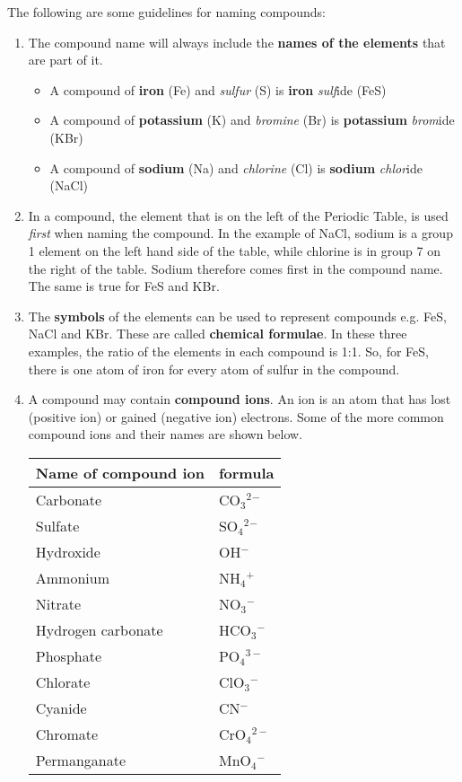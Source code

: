 The following are some guidelines for naming compounds:

\begin{enumerate}

\item{The compound name will always include the \textbf{names of the elements} that are part of it.}

	\begin{itemize}
	\item{A compound of \textbf{iron} (Fe) and \textit{sulfur} (S) is \textbf{iron} \textit{sulf}ide (FeS)}
	\item{A compound of \textbf{potassium} (K) and \textit{bromine} (Br) is \textbf{potassium} \textit{brom}ide (KBr)}
	\item{A compound of \textbf{sodium} (Na) and \textit{chlorine} (Cl) is \textbf{sodium} \textit{chlor}ide (NaCl)}
	\end{itemize}

\item{In a compound, the element that is on the left of the Periodic Table, is used \textit{first} when naming the compound. In the example of NaCl, sodium is a group 1 element on the left hand side of the table, while chlorine is in group 7 on the right of the table. Sodium therefore comes first in the compound name. The same is true for FeS and KBr.}

\item{The \textbf{symbols} of the elements can be used to represent compounds e.g. FeS, NaCl and KBr. These are called \textbf{chemical formulae}. In these three examples, the ratio of the elements in each compound is 1:1. So, for FeS, there is one atom of iron for every atom of sulfur in the compound.}

\item{A compound may contain \textbf{compound ions}. An ion is an atom that has lost (positive ion) or gained (negative ion) electrons. Some of the more common compound ions and their names are shown below.

\begin{center}
\begin{tabular}{|l|l|}\hline
Name of compound ion & formula\\\hline
Carbonate & CO$_3$$^2$$^-$\\\hline
Sulfate & SO$_4$$^2$$^-$\\\hline
Hydroxide & OH$^-$\\\hline
Ammonium & NH$_{4}$$^{+}$\\\hline
Nitrate & NO$_{3}$$^{-}$\\\hline
Hydrogen carbonate & HCO$_3$$^-$\\\hline
Phosphate & PO$_{4}$$^{3-}$\\\hline
Chlorate & ClO$_{3}$$^{-}$\\\hline
Cyanide & CN$^{-}$\\\hline
Chromate & CrO$_{4}$$^{2-}$\\\hline
Permanganate & MnO$_{4}$$^{-}$\\\hline
\end{tabular}
\end{center}
}


\end{enumerate}
